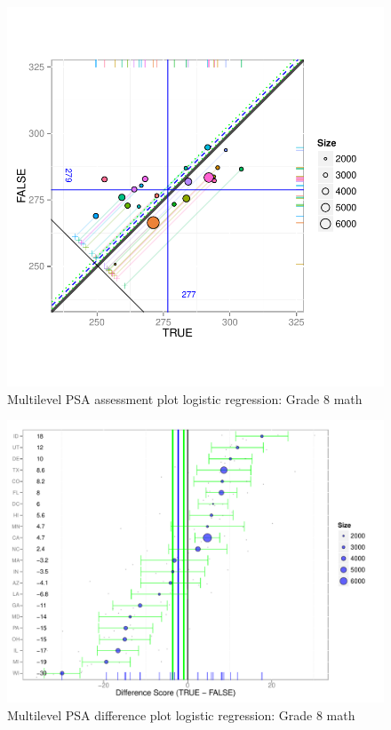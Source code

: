 \begin{figure}[h!]
\begin{center}
\includegraphics[width=\textwidth]{../Figures2009/g8math-mlpsa-lr-circ.pdf}
\caption{Multilevel PSA assessment plot logistic regression: Grade 8 math}
\end{center}
\end{figure}

\begin{figure}[h!]
\begin{center}
\includegraphics[width=\textwidth]{../Figures2009/g8math-mlpsa-lr-diff.pdf}
\caption{Multilevel PSA difference plot logistic regression: Grade 8 math}
\end{center}
\end{figure}

